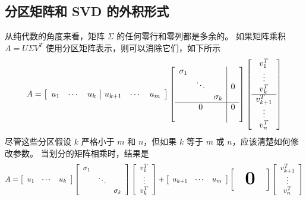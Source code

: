 \documentclass[11pt,a4paper,twoside]{article}
\begin{document}
\begin{CJK}{UTF8}{gbsn}
\subsection{分区矩阵和 SVD 的外积形式}
从纯代数的角度来看，矩阵 $\Sigma$ 的任何零行和零列都是多余的。 如果矩阵乘积 $A=U \Sigma V^{T}$ 使用分区矩阵表示，则可以消除它们，如下所示
$$
A=\left[\begin{array}{lll|lll}
u_{1} & \cdots & u_{k} & u_{k+1} & \cdots & u_{m}
\end{array}\right]\left[\begin{array}{ccc|c}
\sigma_{1} & & & \\
& \ddots & & 0 \\
& & \sigma_{k} & \\
\hline & 0 & & 0 \\
& & &
\end{array}\right]\left[\begin{array}{c}
v_{1}^{T} \\
\vdots \\
v_{k}^{T} \\
\hline v_{k+1}^{T} \\
\vdots \\
v_{n}^{T}
\end{array}\right]
$$
尽管这些分区假设 $k$ 严格小于 $m$ 和 $n$，但如果 $k$ 等于 $m$ 或 $n$，应该清楚如何修改参数。 当划分的矩阵相乘时，结果是
$$
A=\left[\begin{array}{lll}
u_{1} & \cdots & u_{k}
\end{array}\right]\left[\begin{array}{ccc}
\sigma_{1} & & \\
& \ddots & \\
& & \sigma_{k}
\end{array}\right]\left[\begin{array}{c}
v_{1}^{T} \\
\vdots \\
v_{k}^{T}
\end{array}\right]+\left[\begin{array}{lll}
u_{k+1} & \cdots & u_{m}
\end{array}\right]
\begin{Huge}
\left[\begin{array}{ccc}
&
\mathbf{0} &
\\
\end{array}\right]
\end{Huge}
\left[\begin{array}{c}
v_{k+1}^{T} \\
\vdots \\
v_{n}^{T}
\end{array}\right]
$$


\end{CJK}
\end{document}
